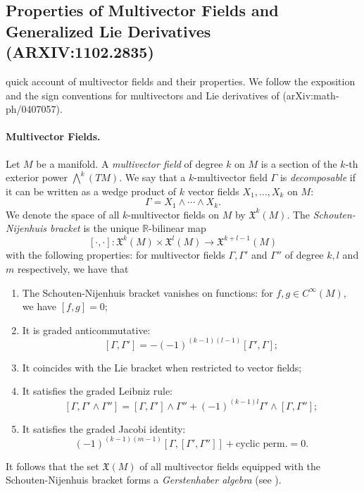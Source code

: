 \documentclass[a4paper,12pt]{scrartcl}
\begin{document}
	\subsection{ Properties of Multivector Fields and Generalized Lie Derivatives (ARXIV:1102.2835)}
	quick account of multivector fields and their properties.  
	We follow the exposition and the sign conventions for multivectors and Lie derivatives of (arXiv:math-ph/0407057).

\paragraph{Multivector Fields.}

Let $M$ be a manifold.  A \emph{ multivector field} of degree $k$ on $M$ is a section of the $k$-th exterior power $\bigwedge^k (TM)$.  We say that a $k$-multivector field $\Gamma$ is \emph{ decomposable} if it can be written as a wedge product of $k$ vector fields $X_1, \ldots, X_k$ on $M$:
\[
	\Gamma = X_1 \wedge \cdots \wedge X_k.
\]
We denote the space of all $k$-multivector fields on $M$ by $\mathfrak{X}^k(M)$.  The \emph{ Schouten-Nijenhuis bracket} is the unique $\mathbb{R}$-bilinear map 
\[
	[\cdot, \cdot] : \mathfrak{X}^k(M) \times \mathfrak{X}^l(M)
		\rightarrow
		\mathfrak{X}^{k + l - 1}(M)
\]
with the following properties: for multivector fields $\Gamma, \Gamma'$ and $\Gamma''$ of degree $k, l$ and $m$ respectively, we have that
\begin{enumerate}
\item The Schouten-Nijenhuis bracket vanishes on functions: for $f, g \in C^\infty(M)$, we have $[f, g] = 0$; 

\item It is graded anticommutative: 
\[
	[\Gamma, \Gamma'] = - (-1)^{(k - 1)(l - 1)} [\Gamma', \Gamma];
\]
\item It coincides with the Lie bracket when restricted to vector fields; 
\item It satisfies the graded Leibniz rule: 
\[
	[\Gamma, \Gamma' \wedge \Gamma''] 
	= 
	[\Gamma, \Gamma'] \wedge \Gamma'' 
	+ (-1)^{(k-1)l} \Gamma' \wedge [\Gamma, \Gamma'']; 
\]
\item It satisfies the graded Jacobi identity:
\[
	(-1)^{(k-1)(m-1)} [\Gamma, [\Gamma', \Gamma'']] + 
		\text{cyclic perm.} = 0.
\]
\end{enumerate}

It follows that the set $\mathfrak{X}(M)$ of all multivector fields equipped with the Schouten-Nijenhuis bracket forms a \emph{ Gerstenhaber algebra} (see \cite{Ge1963}).
\end{document}
